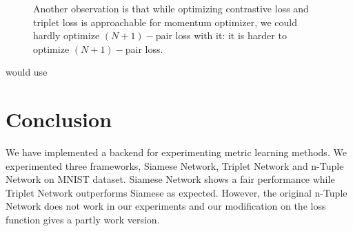 \documentclass[10pt,twocolumn,letterpaper]{article}
\begin{document}
\begin{figure}[t]
				
				Another observation is that while optimizing contrastive loss and triplet loss is approachable for momentum optimizer, we could hardly optimize $(N+1)-$pair loss with it: it is harder to optimize $(N+1)-$pair loss. 
			\end{figure}
would use
	\section{Conclusion \label{sec:Conc}}
		We have implemented a backend for experimenting metric learning methods. We experimented three frameworks, Siamese Network, Triplet Network and n-Tuple Network on MNIST dataset. Siamese Network shows a fair performance while Triplet Network outperforms Siamese as expected. However, the original n-Tuple Network does not work in our experiments and our modification on the loss function gives a partly work version.
	{\small
		
		
	}
	
\end{document}
